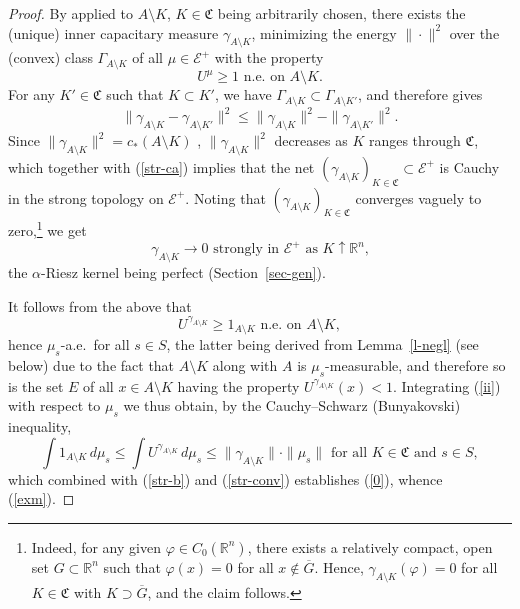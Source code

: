 \documentclass[12pt,a4paper,reqno]{amsart} %
\theoremstyle{lause}
\theoremstyle{maaritelma}
\theoremstyle{lause}
\theoremstyle{maaritelma}
\numberwithin{equation}{section}
\begin{document}
\begin{proof}
By \cite[Theorem~2.6]{L} applied to $A\setminus K$, $K\in\mathfrak C$ being arbitrarily chosen, there exists the (unique) inner capacitary measure $\gamma_{A\setminus K}$, minimizing the energy $\|\cdot\|^2$ over the (convex) class $\Gamma_{A\setminus K}$ of all $\mu\in\mathcal E^+$ with the property
\[U^\mu\geqslant1\text{ \  n.e.\ on $A\setminus K$.}\]
For any $K'\in\mathfrak C$ such that $K\subset K'$, we have $\Gamma_{A\setminus K}\subset\Gamma_{A\setminus K'}$, and  \cite[Lemma~2.2]{L} therefore gives
\begin{equation}\label{str-ca}\|\gamma_{A\setminus K}-\gamma_{A\setminus K'}\|^2\leqslant\|\gamma_{A\setminus K}\|^2-\|\gamma_{A\setminus K'}\|^2.\end{equation}
Since $\|\gamma_{A\setminus K}\|^2=c_*(A\setminus K)$ \cite[Theorem~2.6]{L}, $\|\gamma_{A\setminus K}\|^2$ decreases as $K$ ranges through $\mathfrak C$, which together with (\ref{str-ca}) implies that the net $(\gamma_{A\setminus K})_{K\in\mathfrak C}\subset\mathcal E^+$ is Cauchy in the strong topology on $\mathcal E^+$. Noting that $(\gamma_{A\setminus K})_{K\in\mathfrak C}$ converges vaguely to zero,\footnote{Indeed, for any given $\varphi\in C_0(\mathbb R^n)$, there exists a relatively compact, open set $G\subset\mathbb R^n$ such that $\varphi(x)=0$ for all $x\not\in\overline{G}$. Hence, $\gamma_{A\setminus K}(\varphi)=0$ for all $K\in\mathfrak C$ with $K\supset\overline{G}$, and the claim follows.} we get
\begin{equation}\label{str-conv}
  \gamma_{A\setminus K}\to0\text{ \ strongly in $\mathcal E^+$ as $K\uparrow\mathbb R^n$,}
\end{equation}
the $\alpha$-Riesz kernel being perfect (Section~\ref{sec-gen}).

It follows from the above that
\begin{equation}\label{ii}U^{\gamma_{A\setminus K}}\geqslant1_{A\setminus K}\text{ \ n.e.\ on $A\setminus K$},\end{equation}
hence $\mu_s$-a.e.\ for all $s\in S$, the latter being derived from Lemma~\ref{l-negl} (see below) due to the fact that $A\setminus K$ along with $A$ is $\mu_s$-mea\-sur\-ab\-le, and therefore so is the set $E$ of all $x\in A\setminus K$ having the property $U^{\gamma_{A\setminus K}}(x)<1$. Integrating (\ref{ii}) with respect to $\mu_s$ we thus obtain, by the Cauchy--Schwarz (Bunyakovski) inequality,
\[\int1_{A\setminus K}\,d\mu_s\leqslant\int U^{\gamma_{A\setminus K}}\,d\mu_s\leqslant\|\gamma_{A\setminus K}\|\cdot\|\mu_s\|\text{ \ for all $K\in\mathfrak C$ and $s\in S$},\]
which combined with (\ref{str-b}) and (\ref{str-conv}) establishes (\ref{0}), whence (\ref{exm}).
\end{proof}
\end{document}
